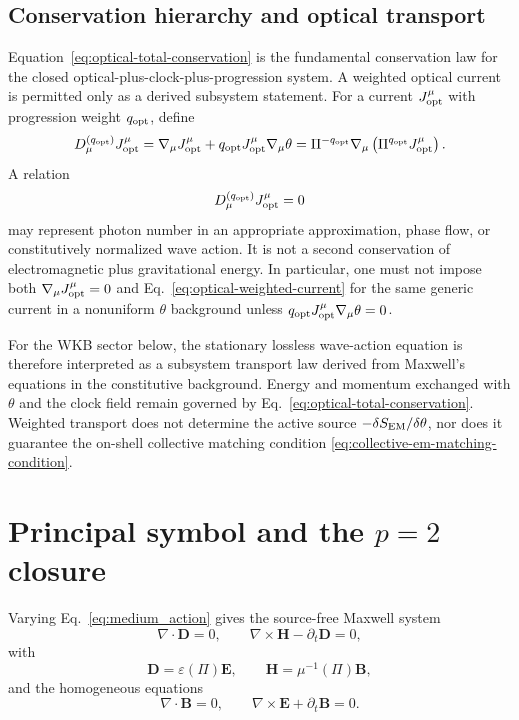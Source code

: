 \documentclass[12pt]{article}
\begin{document}
\subsection{Conservation hierarchy and optical transport}
\label{sec:optical-conservation-hierarchy}

Equation~\eqref{eq:optical-total-conservation} is the fundamental conservation law for the closed optical-plus-clock-plus-progression system.  A weighted optical current is permitted only as a derived subsystem statement.  For a current \(J_{\rm opt}^\mu\) with progression weight \(q_{\rm opt}\), define
\begin{equation}
    D_\mu^{(q_{\rm opt})}J_{\rm opt}^\mu
    =\nabla_\mu J_{\rm opt}^\mu
    +q_{\rm opt}J_{\rm opt}^\mu\nabla_\mu\theta
    =\Pi^{-q_{\rm opt}}
      \nabla_\mu\left(\Pi^{q_{\rm opt}}J_{\rm opt}^\mu\right).
    \label{eq:optical-progression-covariant-current}
\end{equation}
A relation
\begin{equation}
    D_\mu^{(q_{\rm opt})}J_{\rm opt}^\mu=0
    \label{eq:optical-weighted-current}
\end{equation}
may represent photon number in an appropriate approximation, phase flow, or constitutively normalized wave action.  It is not a second conservation of electromagnetic plus gravitational energy.  In particular, one must not impose both \(\nabla_\mu J_{\rm opt}^\mu=0\) and Eq.~\eqref{eq:optical-weighted-current} for the same generic current in a nonuniform \(\theta\) background unless \(q_{\rm opt}J_{\rm opt}^\mu\nabla_\mu\theta=0\).

For the WKB sector below, the stationary lossless wave-action equation is therefore interpreted as a subsystem transport law derived from Maxwell's equations in the constitutive background.  Energy and momentum exchanged with \(\theta\) and the clock field remain governed by Eq.~\eqref{eq:optical-total-conservation}.  Weighted transport does not determine the active source \(-\delta S_{\rm EM}/\delta\theta\), nor does it guarantee the on-shell collective matching condition \eqref{eq:collective-em-matching-condition}.

\section{Principal symbol and the \texorpdfstring{$p=2$}{p=2} closure}
\label{sec:eikonal}

Varying Eq.~\eqref{eq:medium_action} gives the source-free Maxwell system
\begin{equation}
 \nabla\cdot\mathbf D=0,
 \qquad
 \nabla\times\mathbf H-\partial_t\mathbf D=0,
\label{eq:maxwell_inhomogeneous}
\end{equation}
with
\begin{equation}
 \mathbf D=\varepsilon(\Pi)\mathbf E,
 \qquad
 \mathbf H=\mu^{-1}(\Pi)\mathbf B,
\label{eq:DH_def}
\end{equation}
and the homogeneous equations
\begin{equation}
 \nabla\cdot\mathbf B=0,
 \qquad
 \nabla\times\mathbf E+\partial_t\mathbf B=0.
\label{eq:maxwell_homogeneous}
\end{equation}
\end{document}
